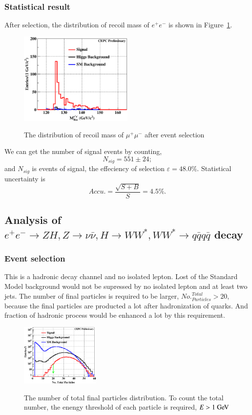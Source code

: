 \documentclass[11pt,a4paper]{cepcnote}
\begin{document}
\subsubsection{Statistical result}
After selection, the distribution of recoil mass of $e^+e^-$ is shown in Figure~\ref{fig:eehuvqqrecfit}.
\begin{figure}[H]
\centering
\includegraphics[width=0.5\textwidth]{e1e1H/uvqq/fit_RecMass}
\label{fig:eehuvqqrecfit}
\caption[]{The distribution of recoil mass of $\mu^+\mu^-$ after event selection}
\end{figure}

We can get the number of signal events by counting,
\begin{equation*}
N_{sig} = 551\pm24 ;
\end{equation*}
and $N_{sig}$ is events of signal, the effeciency of selection $\varepsilon = 48.0\%$. Statistical uncertainty is 
\begin{equation*}
Accu.=\frac{\sqrt{S+B}}{S} = 4.5\%.
\end{equation*}

\subsection{Analysis of $e^+e^-\rightarrow ZH, Z\rightarrow \nu\bar{\nu}, H\rightarrow WW^*, WW^*\rightarrow q\bar{q}q\bar{q}$ decay}
\subsubsection{Event selection}
This is a hadronic decay channel and no isolated lepton. Lost of the Standard Model background would not be 
supressed by no isolated lepton and at least two jets.
The number of final particles is required to be larger, $No._{Particles}^{Total} > 20$, because the final particles are 
producted a lot after hadronization of quarks. And fraction of hadronic process would be enhanced a lot by this requirement.
\begin{figure}[H]
	\centering
	\includegraphics[width= 0.35\textwidth]{nnH/fourq/TotPart}
	\label{fig:nnH4qTotPart}
	\caption[]{The number of total final particles distribution. To count the total number, the enengy threshold of each particle 
	is required, $E > 1\gev$}
\end{figure}
\end{document}
